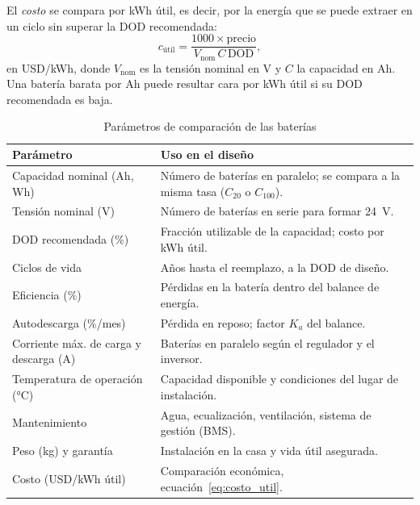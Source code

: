 El \emph{costo} se compara por kWh útil, es decir, por la energía que se puede extraer en un ciclo sin superar la DOD recomendada:
\begin{equation}
c_{\text{útil}} = \frac{1000 \times \text{precio}}{V_{\mathrm{nom}}\,C\,\mathrm{DOD}},
\label{eq:costo_util}
\end{equation}
en USD/kWh, donde $V_{\mathrm{nom}}$ es la tensión nominal en V y $C$ la capacidad en Ah. Una batería barata por Ah puede resultar cara por kWh útil si su DOD recomendada es baja.

\begin{table}[!ht]
\caption{Parámetros de comparación de las baterías}
\label{tab:parametros}
\centering
\footnotesize
\setlength{\tabcolsep}{3pt}
\begin{tabular}{>{\raggedright\arraybackslash}p{} >{\raggedright\arraybackslash}p{}}
\toprule
Parámetro & Uso en el diseño \\
\midrule
Capacidad nominal (Ah, Wh) & Número de baterías en paralelo; se compara a la misma tasa ($C_{20}$ o $C_{100}$). \\
Tensión nominal (V) & Número de baterías en serie para formar \SI{24}{V}. \\
DOD recomendada (\%) & Fracción utilizable de la capacidad; costo por kWh útil. \\
Ciclos de vida & Años hasta el reemplazo, a la DOD de diseño. \\
Eficiencia (\%) & Pérdidas en la batería dentro del balance de energía. \\
Autodescarga (\%/mes) & Pérdida en reposo; factor $K_a$ del balance. \\
Corriente máx. de carga y descarga (A) & Baterías en paralelo según el regulador y el inversor. \\
Temperatura de operación (°C) & Capacidad disponible y condiciones del lugar de instalación. \\
Mantenimiento & Agua, ecualización, ventilación, sistema de gestión (BMS). \\
Peso (kg) y garantía & Instalación en la casa y vida útil asegurada. \\
Costo (USD/kWh útil) & Comparación económica, ecuación~\eqref{eq:costo_util}. \\
\bottomrule
\end{tabular}
\end{table}
